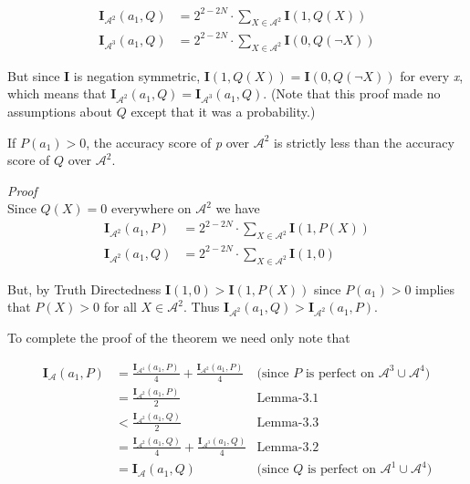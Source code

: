 \documentclass[
  10pt,
  letterpaper,
  DIV=11,
  numbers=noendperiod,
  twoside]{scrartcl}
\providecommand{\tightlist}{%
  \setlength{\itemsep}{0pt}\setlength{\parskip}{0pt}}\usepackage{longtable,booktabs,array}
\begin{document}
\[
\begin{aligned}
\mathbf{I}_{\mathscr{A}^2}(a_1, Q) &= 2^{2-2N} \cdot \sum_{X \in \mathscr{A}^2} \mathbf{I}(1, Q(X)) \\
\mathbf{I}_{\mathscr{A}^3}(a_1, Q) &= 2^{2-2N} \cdot \sum_{X \in \mathscr{A}^2} \mathbf{I}(0, Q(\neg X))
\end{aligned}
\]

But since \textbf{I} is negation symmetric,
\(\mathbf{I}(1, Q(X)) = \mathbf{I}(0, Q(\neg X))\) for every \emph{x},
which means that
\(\mathbf{I}_{\mathscr{A}^2}(a_1, Q) = \mathbf{I}_{\mathscr{A}^3}(a_1, Q)\).
(Note that this proof made no assumptions about \(Q\) except that it was
a probability.)

\begin{description}
\tightlist
\item[Lemma-3.3]
If \(P(a_1) > 0\), the accuracy score of \emph{p} over \(\mathscr{A}^2\)
is strictly less than the accuracy score of \(Q\) over
\(\mathscr{A}^2\).
\end{description}

\emph{Proof}\\
Since \(Q(X) = 0\) everywhere on \(\mathscr{A}^2\) we have
\[\begin{aligned}
\mathbf{I}_{\mathscr{A}^2}(a_1, P) &= 2^{2-2N} \cdot \sum_{X \in \mathscr{A}^2} \mathbf{I}(1, P(X)) \\
\mathbf{I}_{\mathscr{A}^2}(a_1, Q) &= 2^{2-2N} \cdot \sum_{X \in \mathscr{A}^2} \mathbf{I}(1, 0) 
\end{aligned}
\]

But, by Truth Directedness \(\mathbf{I}(1, 0) > \mathbf{I}(1, P(X))\)
since \(P(a_1) > 0\) implies that \(P(X) > 0\) for all
\(X \in \mathscr{A}^2\). Thus
\(\mathbf{I}_{\mathscr{A}^2}(a_1, Q) > \mathbf{I}_{\mathscr{A}^2}(a_1, P)\).

To complete the proof of the theorem we need only note that

\[
\begin{aligned}
\mathbf{I}_{\mathscr{A}}(a_1, P) &= \frac{\mathbf{I}_{\mathscr{A}^1}(a_1, P)}{4} + \frac{\mathbf{I}_{\mathscr{A}^2}(a_1, P)}{4} &\text{(since }P\text{ is perfect on }\mathscr{A}^3 \cup \mathscr{A}^4) \\
&= \frac{\mathbf{I}_{\mathscr{A}^2}(a_1, P)}{2} &\text{Lemma-3.1} \\
&< \frac{\mathbf{I}_{\mathscr{A}^2}(a_1, Q)}{2} &\text{Lemma-3.3} \\
&= \frac{\mathbf{I}_{\mathscr{A}^2}(a_1, Q)}{4} + \frac{\mathbf{I}_{\mathscr{A}^3}(a_1, Q)}{4} &\text{Lemma-3.2} \\
&= \mathbf{I}_{\mathscr{A}}(a_1, Q) &\text{(since }Q\text{ is perfect on }\mathscr{A}^1 \cup \mathscr{A}^4)
\end{aligned}
\]
\end{document}
